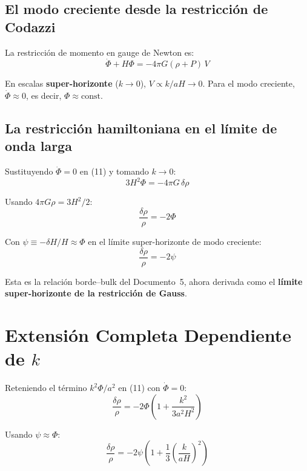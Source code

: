 \documentclass[12pt,a4paper]{article}
\begin{document}
\subsection{El modo creciente desde la restricción de Codazzi}

La restricción de momento en gauge de Newton es:
\begin{equation}
\dot\Phi + H\Phi = -4\pi G(\rho + P)\,V \tag{12}
\end{equation}

En escalas \textbf{super-horizonte} ($k \to 0$), $V \propto k/aH \to 0$. Para el modo creciente, $\dot\Phi \approx 0$, es decir, $\Phi \approx \text{const}$.

\subsection{La restricción hamiltoniana en el límite de onda larga}

Sustituyendo $\dot\Phi = 0$ en (11) y tomando $k \to 0$:
\begin{equation}
3H^2\Phi = -4\pi G\,\delta\rho \tag{13}
\end{equation}

Usando $4\pi G\rho = 3H^2/2$:
\begin{equation}
\frac{\delta\rho}{\rho} = -2\Phi \tag{14}
\end{equation}

Con $\psi \equiv -\delta H/H \approx \Phi$ en el límite super-horizonte de modo creciente:
\begin{equation}
\boxed{\frac{\delta\rho}{\rho} = -2\psi} \tag{15}
\end{equation}

Esta es la relación borde--bulk del Documento~5, ahora derivada como el \textbf{límite super-horizonte de la restricción de Gauss}.

\section{Extensión Completa Dependiente de $k$}

Reteniendo el término $k^2\Phi/a^2$ en (11) con $\dot\Phi = 0$:
\begin{equation}
\frac{\delta\rho}{\rho} = -2\Phi\!\left(1 + \frac{k^2}{3a^2H^2}\right) \tag{16}
\end{equation}

Usando $\psi \approx \Phi$:
\begin{equation}
\boxed{\frac{\delta\rho}{\rho} = -2\psi\!\left(1 + \frac{1}{3}\left(\frac{k}{aH}\right)^2\right)} \tag{17}
\end{equation}
\end{document}
